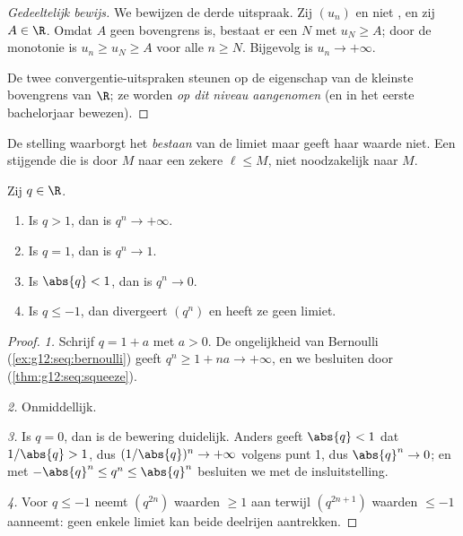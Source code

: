 \begin{proof}[Gedeeltelijk bewijs]
We bewijzen de derde uitspraak. Zij $(u_n)$  en niet , en zij $A \in \R$. Omdat $A$ geen bovengrens is, bestaat er een $N$
met $u_N \geq A$; door de monotonie is $u_n \geq u_N \geq A$ voor alle
$n \geq N$. Bijgevolg is $u_n \to +\infty$.

De twee convergentie-uitspraken steunen op de eigenschap van de kleinste
bovengrens van $\R$; ze worden \emph{op dit niveau aangenomen} (en in het
eerste bachelorjaar bewezen).
\end{proof}

\begin{remark}
De stelling waarborgt het \emph{bestaan} van de limiet maar geeft haar waarde
niet. Een stijgende  die  is door $M$  naar
een zekere $\ell \leq M$, niet noodzakelijk naar $M$.
\end{remark}

\begin{theorem}\label{thm:g12:seq:geometric}
Zij $q \in \R$.
\begin{enumerate}
  \item Is $q > 1$, dan is $q^n \to +\infty$.
  \item Is $q = 1$, dan is $q^n \to 1$.
  \item Is $\abs{q} < 1$, dan is $q^n \to 0$.
  \item Is $q \leq -1$, dan divergeert $(q^n)$ en heeft ze geen limiet.
\end{enumerate}
\end{theorem}

\begin{proof}
\emph{1.} Schrijf $q = 1 + a$ met $a > 0$. De ongelijkheid van Bernoulli
(\cref{ex:g12:seq:bernoulli}) geeft $q^n \geq 1 + na \to +\infty$, en we
besluiten door  (\cref{thm:g12:seq:squeeze}).

\emph{2.} Onmiddellijk.

\emph{3.} Is $q = 0$, dan is de bewering duidelijk. Anders geeft
$\abs{q} < 1$ dat $1/\abs{q} > 1$, dus $(1/\abs{q})^n \to +\infty$ volgens
punt 1, dus $\abs{q}^n \to 0$; en met
$-\abs{q}^n \leq q^n \leq \abs{q}^n$ besluiten we met de insluitstelling.

\emph{4.} Voor $q \leq -1$ neemt $(q^{2n})$ waarden $\geq 1$ aan terwijl
$(q^{2n+1})$ waarden $\leq -1$ aanneemt: geen enkele limiet kan beide
deelrijen aantrekken.
\end{proof}

